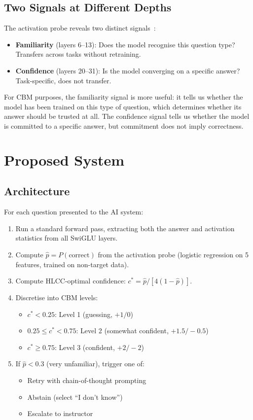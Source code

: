 \documentclass[11pt,a4paper]{article}
\begin{document}
\subsection{Two Signals at Different Depths}

The activation probe reveals two distinct signals~\citep{mccallum2026activation}:
\begin{itemize}
    \item \textbf{Familiarity} (layers 6--13): Does the model recognise this question type? Transfers across tasks without retraining.
    \item \textbf{Confidence} (layers 20--31): Is the model converging on a specific answer? Task-specific, does not transfer.
\end{itemize}

For CBM purposes, the familiarity signal is more useful: it tells us whether the model has been trained on this type of question, which determines whether its answer should be trusted at all.
The confidence signal tells us whether the model is committed to a specific answer, but commitment does not imply correctness.

\section{Proposed System}

\subsection{Architecture}

For each question presented to the AI system:

\begin{enumerate}
    \item Run a standard forward pass, extracting both the answer and activation statistics from all SwiGLU layers.
    \item Compute $\hat{p} = P(\text{correct})$ from the activation probe (logistic regression on 5 features, trained on non-target data).
    \item Compute HLCC-optimal confidence: $c^* = \hat{p}/[4(1-\hat{p})]$.
    \item Discretise into CBM levels:
    \begin{itemize}
        \item $c^* < 0.25$: Level 1 (guessing, $+1/0$)
        \item $0.25 \leq c^* < 0.75$: Level 2 (somewhat confident, $+1.5/-0.5$)
        \item $c^* \geq 0.75$: Level 3 (confident, $+2/-2$)
    \end{itemize}
    \item If $\hat{p} < 0.3$ (very unfamiliar), trigger one of:
    \begin{itemize}
        \item Retry with chain-of-thought prompting
        \item Abstain (select ``I don't know'')
        \item Escalate to instructor
    \end{itemize}
\end{enumerate}
\end{document}
